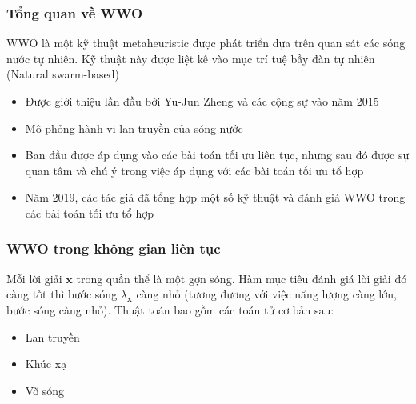 \begin{frame}
    \frametitle{Tổng quan về WWO}
    WWO là một kỹ thuật metaheuristic được phát triển dựa trên quan sát các sóng nước tự nhiên. Kỹ thuật này được liệt kê vào mục trí tuệ bầy đàn tự nhiên (Natural swarm-based) \cite{hussain2019metaheuristic}
    
    \begin{itemize}
        \item Được giới thiệu lần đầu bởi Yu-Jun Zheng và các cộng sự vào năm 2015 \cite{zheng2015water}
        \item Mô phỏng hành vi lan truyền của sóng nước
        \item Ban đầu được áp dụng vào các bài toán tối ưu liên tục, nhưng sau đó được sự quan tâm và chú ý trong việc áp dụng với các bài toán tối ưu tổ hợp
        \item Năm 2019, các tác giả đã tổng hợp một số kỹ thuật và đánh giá WWO trong các bài toán tối ưu tổ hợp \cite{zheng2019water}
    \end{itemize}
\end{frame}

\begin{frame}
    \frametitle{WWO trong không gian liên tục}
    Mỗi lời giải $\mathbf{x}$ trong quần thể là một gợn sóng. Hàm mục tiêu đánh giá lời giải đó càng tốt thì bước sóng $\lambda_{\mathbf{x}}$ càng nhỏ (tương đương với việc năng lượng càng lớn, bước sóng càng nhỏ).
    Thuật toán bao gồm các toán tử cơ bản sau:
    \begin{itemize}
        \item Lan truyền
        \item Khúc xạ
        \item Vỡ sóng
    \end{itemize}
\end{frame}

